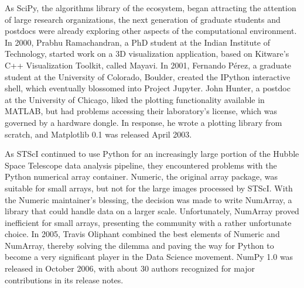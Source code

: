\documentclass[fleqn,10pt]{wlscirep}
\begin{document}
As SciPy, the algorithms library of the ecosystem, began attracting the attention
of large research organizations,
the next generation of graduate students and postdocs were already exploring
other aspects of the computational environment.
In 2000, Prabhu Ramachandran, a PhD student at the Indian Institute of
Technology, started work on a 3D visualization application, based on
Kitware's C++ Visualization Toolkit\cite{schroeder:2006:VTK}, called
Mayavi\cite{mayavi-intro}.
In 2001, Fernando Pérez, a graduate student at the University of
Colorado, Boulder, created the IPython interactive shell, which
eventually blossomed into Project Jupyter\cite{Kluyver:2016aa}.
John Hunter, a postdoc
at the University
of Chicago, liked the plotting functionality
available in MATLAB\cite{matlab}, but had problems accessing their laboratory's
license, which was governed by a hardware dongle.  In response, he
wrote a plotting library from scratch, and Matplotlib 0.1 was released
April 2003\cite{matplotlib-rel}.





As STScI continued to use Python for an increasingly large portion
of the Hubble Space Telescope data analysis pipeline, they encountered
problems with the Python numerical array container.
Numeric, the original array package, was
suitable for small arrays, but not for the large images processed by
STScI\@.  With the Numeric maintainer's blessing, the decision was made
to write NumArray\cite{greenfield2003numarray}, a library that could handle data on a larger
scale.  Unfortunately, NumArray proved inefficient for small arrays,
presenting the community with a rather unfortunate choice.  In 2005,
Travis Oliphant combined the best elements of Numeric and NumArray,
thereby solving the dilemma and paving the way for Python to become
a very significant player in the Data Science movement. NumPy
1.0 was released in October 2006\cite{numpy-1.0-tag}, with about 30
authors recognized for major contributions in its release notes.
\end{document}
